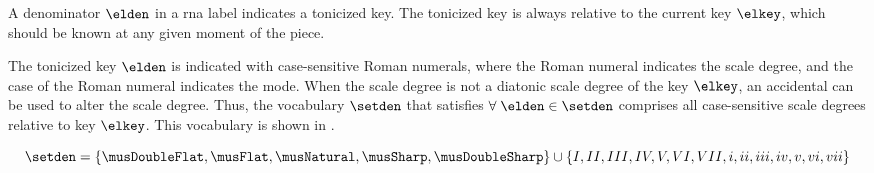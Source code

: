 
A denominator $\elden$ in a \gls{rna} label indicates a
tonicized key. The tonicized key is always relative to the
current key $\elkey$, which should be known at any given
moment of the piece.

The tonicized key $\elden$ is indicated with case-sensitive
Roman numerals, where the Roman numeral indicates the scale
degree, and the case of the Roman numeral indicates the
mode. When the scale degree is not a diatonic scale degree
of the key $\elkey$, an accidental can be used to alter the
scale degree. Thus, the vocabulary $\setden$ that satisfies
$\forall \; \elden \in \setden$ comprises all case-sensitive
scale degrees relative to key $\elkey$. This vocabulary is
shown in .

\begin{equation}
    \label{eq:all_denominators}
    \setden = \{ \musDoubleFlat, \musFlat, \musNatural, 
    \musSharp, \musDoubleSharp \} \cup \{ I, II, III, IV, V, VI, VII, 
    i, ii, iii, iv, v, vi, vii \}
\end{equation}
